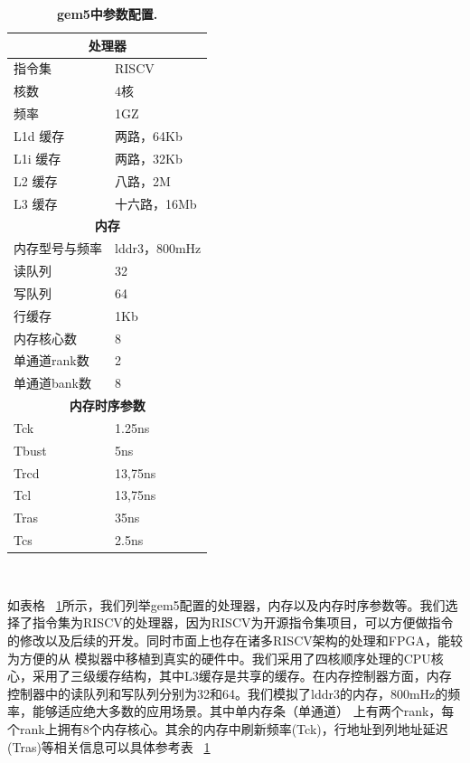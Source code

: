 \begin{table}[htp]
    \centering
    \footnotesize
    \caption{\textbf{gem5中参数配置.}}
    \label{t:gem5-config}
    \begin{tabular}{p{3.25cm}<{\centering} p{3.25cm}<{\centering} }
    \toprule
    \multicolumn{2}{c}{\textbf{处理器}} \\ \hline
    指令集              & RISCV    \\
    核数    &   4核 \\
    频率    &   1GZ \\
    L1d 缓存    &   两路，64Kb   \\
    L1i 缓存    &   两路，32Kb  \\
    L2 缓存    &   八路，2M  \\
    L3 缓存    &   十六路，16Mb  \\ \hline
    \multicolumn{2}{c}{\textbf{内存}} \\ \hline
    内存型号与频率    &   lddr3，800mHz \\
    读队列    &   32 \\
    写队列    &   64 \\
    行缓存    &   1Kb \\
    内存核心数    &   8 \\
    单通道rank数    &   2 \\
    单通道bank数    &   8\\ \hline
    \multicolumn{2}{c}{\textbf{内存时序参数}} \\ \hline
    Tck    &   1.25ns \\
    Tbust    &   5ns \\
    Trcd    &   13,75ns \\
    Tcl   &   13,75ns \\
    Tras    &   35ns \\
    Tcs   &   2.5ns \\
    \bottomrule
    \end{tabular} \\[-5pt]
\end{table}

如表格 ~\ref{t:gem5-config}所示，我们列举gem5配置的处理器，内存以及内存时序参数等。我们选择了指令集为RISCV的处理器，因为RISCV为开源指令集项目，可以方便做指令的修改以及后续的开发。同时市面上也存在诸多RISCV架构的处理和FPGA，能较为方便的从
模拟器中移植到真实的硬件中。我们采用了四核顺序处理的CPU核心，采用了三级缓存结构，其中L3缓存是共享的缓存。在内存控制器方面，内存控制器中的读队列和写队列分别为32和64。我们模拟了lddr3的内存，800mHz的频率，能够适应绝大多数的应用场景。其中单内存条（单通道）
上有两个rank，每个rank上拥有8个内存核心。其余的内存中刷新频率(Tck)，行地址到列地址延迟(Tras)等相关信息可以具体参考表 ~\ref{t:gem5-config}

